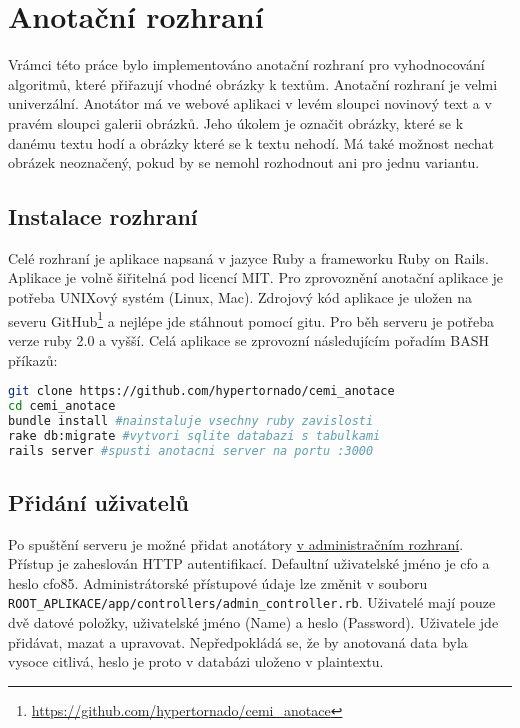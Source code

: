 \chapter{Anotační rozhraní}

Vrámci této práce bylo implementováno anotační rozhraní pro vyhodnocování algoritmů, které přiřazují vhodné obrázky k textům. Anotační rozhraní je velmi univerzální. Anotátor má ve webové aplikaci v levém sloupci novinový text a v pravém sloupci galerii obrázků. Jeho úkolem je označit obrázky, které se k danému textu hodí a obrázky které se k textu nehodí. Má také možnost nechat obrázek neoznačený, pokud by se nemohl rozhodnout ani pro jednu variantu.

\section{Instalace rozhraní}

Celé rozhraní je aplikace napsaná v jazyce Ruby a frameworku Ruby on Rails. Aplikace je volně šiřitelná pod licencí MIT. Pro zprovoznění anotační aplikace je potřeba UNIXový systém (Linux, Mac). Zdrojový kód aplikace je uložen na severu GitHub\footnote{\url{https://github.com/hypertornado/cemi_anotace}} a nejlépe jde stáhnout pomocí gitu. Pro běh serveru je potřeba verze ruby 2.0 a vyšší. Celá aplikace se zprovozní následujícím pořadím BASH příkazů:

\begin{lstlisting}[language=bash]
git clone https://github.com/hypertornado/cemi_anotace
cd cemi_anotace
bundle install #nainstaluje vsechny ruby zavislosti
rake db:migrate #vytvori sqlite databazi s tabulkami
rails server #spusti anotacni server na portu :3000
\end{lstlisting}

\section{Přidání uživatelů}

Po spuštění serveru je možné přidat anotátory \href{http://localhost:3000/users}{v administračním rozhraní}. Přístup je zaheslován HTTP autentifikací. Defaultní uživatelské jméno je cfo a heslo cfo85. Administrátorské přístupové údaje lze změnit v souboru \lstinline{ROOT_APLIKACE/app/controllers/admin_controller.rb}. Uživatelé mají pouze dvě datové položky, uživatelské jméno (Name) a heslo (Password). Uživatele jde přidávat, mazat a upravovat. Nepředpokládá se, že by anotovaná data byla vysoce citlivá, heslo je proto v databázi uloženo v plaintextu.

